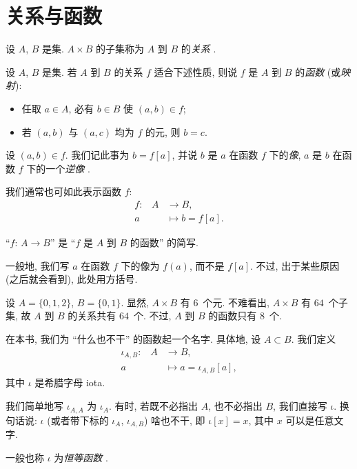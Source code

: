 \section{关系与函数}

\begin{definition}
    设 $A$, $B$ 是集.
    $A \times B$ 的子集称为 $A$ 到 $B$ 的\emph{关系}%
    .
\end{definition}

\begin{definition}
    设 $A$, $B$ 是集.
    若 $A$ 到 $B$ 的关系 $f$ 适合下述性质,
    则说 $f$ 是 $A$ 到 $B$ 的\emph{函数}
    (或\emph{映射}):
    \begin{itemize}
        \item 任取 $a \in A$, 必有 $b \in B$ 使 $(a,b) \in f$;
        \item 若 $(a,b)$ 与 $(a,c)$ 均为 $f$ 的元, 则 $b = c$.
    \end{itemize}
    设 $(a,b) \in f$.
    我们记此事为 $b = f[a]$,
    并说 $b$ 是 $a$ 在函数 $f$ 下的\emph{像},
    $a$ 是 $b$ 在函数 $f$ 下的一个\emph{逆像}%
    .

    我们通常也可如此表示函数 $f$:
    \begin{align*}
        \text{$f$:} \quad
        A & \to B,            \\
        a & \mapsto b = f[a].
    \end{align*}

    ``$f$: $A \to B$'' 是
    ``$f$ 是 $A$ 到 $B$ 的函数'' 的简写.
\end{definition}

\begin{remark}
    一般地, 我们写 $a$ 在函数 $f$ 下的像为 $f(a)$, 而不是 $f[a]$.
    不过, 出于某些原因 (之后就会看到), 此处用方括号.
\end{remark}

\begin{example}
    设 $A = \{ 0,1,2 \}$, $B = \{ 0,1 \}$.
    显然, $A \times B$ 有 $6$~个元.
    不难看出, $A \times B$ 有 $64$~个子集,
    故 $A$ 到 $B$ 的关系共有 $64$~个.
    不过, $A$ 到 $B$ 的函数只有 $8$~个.
\end{example}

\begin{definition}
    在本书, 我们为 ``什么也不干'' 的函数起一个名字.
    具体地, 设 $A \subset B$.
    我们定义
    \begin{align*}
        \text{$\iota_{A,B}$:} \quad
        A & \to B,                       \\
        a & \mapsto a = \iota_{A,B} [a],
    \end{align*}
    其中 $\iota$ 是希腊字母 iota.

    我们简单地写 $\iota_{A,A}$ 为 $\iota_{A}$.
    有时, 若既不必指出 $A$, 也不必指出 $B$,
    我们直接写 $\iota$.
    换句话说:
    $\iota$
    (或者带下标的 $\iota_{A}$, $\iota_{A,B}$) 啥也不干,
    即 $\iota[x] = x$,
    其中 $x$ 可以是任意文字.

    一般也称 $\iota$ 为\emph{恒等函数}%
    .
\end{definition}

